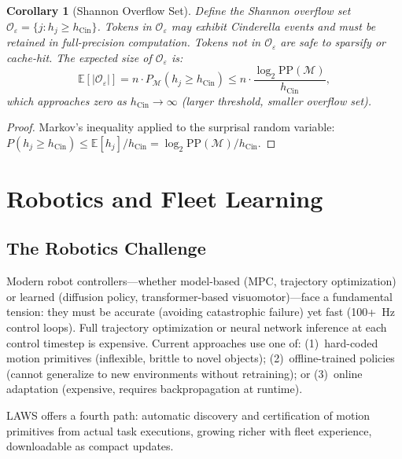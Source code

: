 \documentclass[11pt]{article}
\newtheorem{corollary}{Corollary}
\begin{document}
\begin{corollary}[Shannon Overflow Set]
\label{cor:overflow}
Define the \emph{Shannon overflow set} $\mathcal{O}_\varepsilon = \{j : h_j \geq
h_{\mathrm{Cin}}\}$.  Tokens in $\mathcal{O}_\varepsilon$ may exhibit Cinderella
events and must be retained in full-precision computation.  Tokens not in
$\mathcal{O}_\varepsilon$ are safe to sparsify or cache-hit.  The expected
size of $\mathcal{O}_\varepsilon$ is:
\[
  \mathbb{E}[|\mathcal{O}_\varepsilon|]
  = n \cdot P_{\mathcal{M}}(h_j \geq h_{\mathrm{Cin}})
  \leq n \cdot \frac{\log_2 \mathrm{PP}(\mathcal{M})}{h_{\mathrm{Cin}}},
\]
which approaches zero as $h_{\mathrm{Cin}} \to \infty$ (larger threshold,
smaller overflow set).
\end{corollary}

\begin{proof}
Markov's inequality applied to the surprisal random variable:
$P(h_j \geq h_{\mathrm{Cin}}) \leq \mathbb{E}[h_j]/h_{\mathrm{Cin}}
= \log_2 \mathrm{PP}(\mathcal{M})/h_{\mathrm{Cin}}$.
\end{proof}

\section{Robotics and Fleet Learning}
\label{sec:robotics}

\subsection{The Robotics Challenge}

Modern robot controllers---whether model-based (MPC, trajectory optimization)
or learned (diffusion policy, transformer-based visuomotor)---face a fundamental
tension: they must be accurate (avoiding catastrophic failure) yet fast (100+~Hz
control loops).  Full trajectory optimization or neural network inference at
each control timestep is expensive.  Current approaches use one of: (1)~hard-coded
motion primitives (inflexible, brittle to novel objects); (2)~offline-trained
policies (cannot generalize to new environments without retraining); or
(3)~online adaptation (expensive, requires backpropagation at runtime).

LAWS offers a fourth path: automatic discovery and certification of motion
primitives from actual task executions, growing richer with fleet experience,
downloadable as compact updates.
\end{document}
